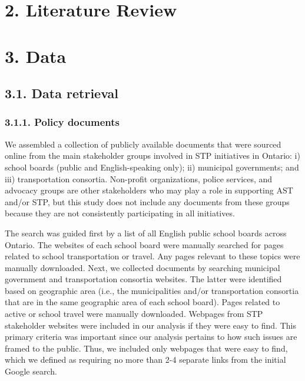 \documentclass[]{elsarticle} %
\begin{document}
\hypertarget{literature-review}{%
\section{2. Literature Review}\label{literature-review}}

\hypertarget{data}{%
\section{3. Data}\label{data}}

\hypertarget{data-retrieval}{%
\subsection{3.1. Data retrieval}\label{data-retrieval}}

\hypertarget{policy-documents}{%
\subsubsection{3.1.1. Policy documents}\label{policy-documents}}

We assembled a collection of publicly available documents that were
sourced online from the main stakeholder groups involved in STP
initiatives in Ontario: i) school boards (public and English-speaking
only); ii) municipal governments; and iii) transportation consortia.
Non-profit organizations, police services, and advocacy groups are other
stakeholders who may play a role in supporting AST and/or STP, but this
study does not include any documents from these groups because they are
not consistently participating in all initiatives.

The search was guided first by a list of all English public school
boards across Ontario. The websites of each school board were manually
searched for pages related to school transportation or travel. Any pages
relevant to these topics were manually downloaded. Next, we collected
documents by searching municipal government and transportation consortia
websites. The latter were identified based on geographic area (i.e., the
municipalities and/or transportation consortia that are in the same
geographic area of each school board). Pages related to active or school
travel were manually downloaded. Webpages from STP stakeholder websites
were included in our analysis if they were easy to find. This primary
criteria was important since our analysis pertains to how such issues
are framed to the public. Thus, we included only webpages that were easy
to find, which we defined as requiring no more than 2-4 separate links
from the initial Google search.
\end{document}
